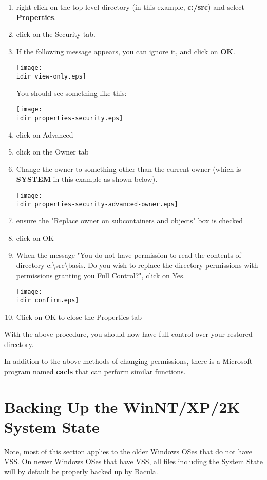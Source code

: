 \begin{enumerate}
\item right click on the top level directory (in this example, {\bf c:/src})
   and  select {\bf Properties}. 
\item click on the Security tab. 
\item If the following message appears, you can ignore it, and click on {\bf
   OK}. 

\texttt{[image: \\idir view-only.eps]} 

You should see something like this: 

\texttt{[image: \\idir properties-security.eps]} 
\item click on Advanced 
\item click on the Owner tab 
\item Change the owner to something other than the current owner (which is
   {\bf SYSTEM} in this example as shown below). 

\texttt{[image: \\idir properties-security-advanced-owner.eps]} 
\item ensure the "Replace owner on subcontainers and objects" box is 
   checked 
\item click on OK 
\item When the message "You do not have permission to read the contents of
   directory c:\textbackslash{}src\textbackslash{}basis. Do you wish to replace
   the directory permissions with permissions granting you Full Control?", click
on Yes. 

\texttt{[image: \\idir confirm.eps]} 
\item Click on OK to close the Properties tab 
   \end{enumerate}

With the above procedure, you should now have full control over your restored
directory. 

In addition to the above methods of changing permissions, there is a Microsoft
program named {\bf cacls} that can perform similar functions.

\section{Backing Up the WinNT/XP/2K System State}

Note, most of this section applies to the older Windows OSes that
do not have VSS. On newer Windows OSes that have VSS, all files
including the System State will by default be properly backed
up by Bacula.

